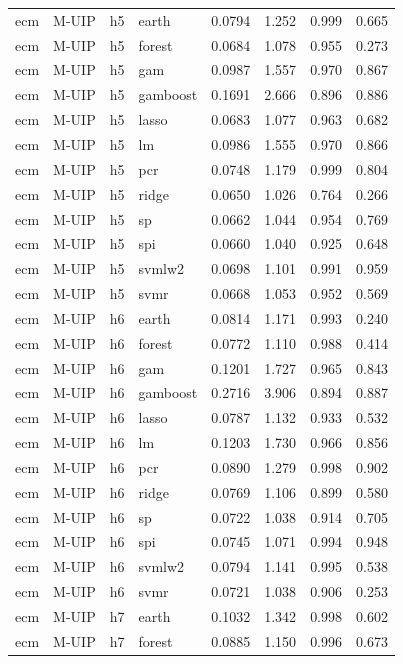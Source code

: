 \begin{ThreePartTable}
\begin{longtable}[t]{llclcccc}
\addlinespace
ecm & M-UIP & h5 & earth & 0.0794 & 1.252 & 0.999 & 0.665\\
ecm & M-UIP & h5 & forest & 0.0684 & 1.078 & 0.955 & 0.273\\
ecm & M-UIP & h5 & gam & 0.0987 & 1.557 & 0.970 & 0.867\\
ecm & M-UIP & h5 & gamboost & 0.1691 & 2.666 & 0.896 & 0.886\\
ecm & M-UIP & h5 & lasso & 0.0683 & 1.077 & 0.963 & 0.682\\
ecm & M-UIP & h5 & lm & 0.0986 & 1.555 & 0.970 & 0.866\\
ecm & M-UIP & h5 & pcr & 0.0748 & 1.179 & 0.999 & 0.804\\
ecm & M-UIP & h5 & ridge & 0.0650 & 1.026 & 0.764 & 0.266\\
ecm & M-UIP & h5 & sp & 0.0662 & 1.044 & 0.954 & 0.769\\
ecm & M-UIP & h5 & spi & 0.0660 & 1.040 & 0.925 & 0.648\\
ecm & M-UIP & h5 & svmlw2 & 0.0698 & 1.101 & 0.991 & 0.959\\
ecm & M-UIP & h5 & svmr & 0.0668 & 1.053 & 0.952 & 0.569\\
\addlinespace
ecm & M-UIP & h6 & earth & 0.0814 & 1.171 & 0.993 & 0.240\\
ecm & M-UIP & h6 & forest & 0.0772 & 1.110 & 0.988 & 0.414\\
ecm & M-UIP & h6 & gam & 0.1201 & 1.727 & 0.965 & 0.843\\
ecm & M-UIP & h6 & gamboost & 0.2716 & 3.906 & 0.894 & 0.887\\
ecm & M-UIP & h6 & lasso & 0.0787 & 1.132 & 0.933 & 0.532\\
ecm & M-UIP & h6 & lm & 0.1203 & 1.730 & 0.966 & 0.856\\
ecm & M-UIP & h6 & pcr & 0.0890 & 1.279 & 0.998 & 0.902\\
ecm & M-UIP & h6 & ridge & 0.0769 & 1.106 & 0.899 & 0.580\\
ecm & M-UIP & h6 & sp & 0.0722 & 1.038 & 0.914 & 0.705\\
ecm & M-UIP & h6 & spi & 0.0745 & 1.071 & 0.994 & 0.948\\
ecm & M-UIP & h6 & svmlw2 & 0.0794 & 1.141 & 0.995 & 0.538\\
ecm & M-UIP & h6 & svmr & 0.0721 & 1.038 & 0.906 & 0.253\\
\addlinespace
ecm & M-UIP & h7 & earth & 0.1032 & 1.342 & 0.998 & 0.602\\
ecm & M-UIP & h7 & forest & 0.0885 & 1.150 & 0.996 & 0.673\\

\end{longtable}
\end{ThreePartTable}
